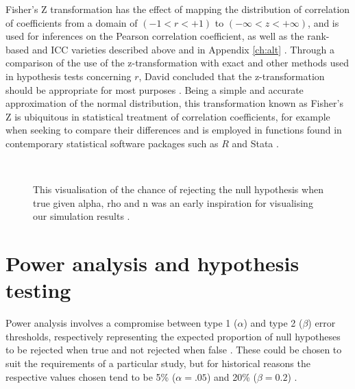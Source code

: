 Fisher's Z transformation has the effect of mapping the distribution of correlation of coefficients from a domain of $(-1 < r < +1)$ to $(-\infty < z < +\infty)$, and is used for inferences on the Pearson correlation coefficient, as well as the rank-based and ICC varieties described above and in Appendix \ref{ch:alt} \cite{Fisher1990, Fieller1957, Barrett2008}.  Through a comparison of the use of the z-transformation with exact and other methods used in hypothesis tests concerning $r$, David concluded that the z-transformation should be appropriate for most purposes \cite{David1938}.  Being a simple and accurate approximation of the normal distribution, this transformation known as Fisher's Z is ubiquitous in statistical treatment of correlation coefficients, for example when seeking to compare their differences and is employed in functions found in contemporary statistical software packages such as $R$ and Stata \cite{R2018,StataCorp2013}.

\\

\begin{figure}[htbp]
\sidecaption[t]
{}
\caption{This visualisation of the chance of rejecting the null hypothesis when true given alpha, rho and n was an early inspiration for visualising our simulation results \cite{David1938}.}
\label{fig:davidplot}       %
\end{figure}

\section{Power analysis and hypothesis testing} 
Power analysis involves a compromise between type 1 ($\alpha$) and type 2 ($\beta$) error thresholds, respectively representing the expected proportion of null hypotheses to be rejected when true and not rejected when false  \cite{Freiman1978}.  These could be chosen to suit the requirements of a particular study, but for historical reasons the respective values chosen tend to be 5\% ($\alpha = .05$) and 20\% ($\beta = 0.2$) \cite{Cohen1988}.  

